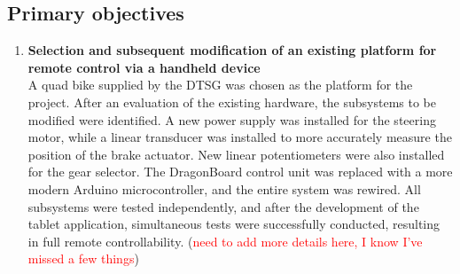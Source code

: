 \documentclass[main.tex]{subfiles}
\begin{document}
\subsection{Primary objectives}
\begin{enumerate}
\item \textbf{Selection and subsequent modification of an existing platform for remote control via a handheld device}\\ 
A quad bike supplied by the DTSG was chosen as the platform for the project. After an evaluation of the existing hardware, the subsystems to be modified were identified. A new power supply was installed for the steering motor, while a linear transducer was installed to more accurately measure the position of the brake actuator. New linear potentiometers were also installed for the gear selector. The DragonBoard control unit was replaced with a more modern Arduino microcontroller, and the entire system was rewired. All subsystems were tested independently, and after the development of the tablet application, simultaneous tests were successfully conducted, resulting in full remote controllability. (\textcolor{red}{need to add more details here, I know I've missed a few things})   


\end{enumerate}
\end{document}
